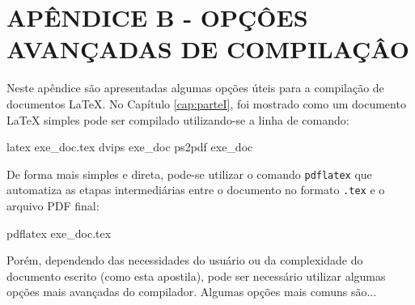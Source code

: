 \hypertarget{estilo:apendice1}{} %
\renewcommand{\thechapter}{}%
\chapter{APÊNDICE B - OPÇÔES AVANÇADAS DE COMPILAÇÂO}  %
\label{apendiceB} %
\renewcommand{\thechapter}{B}%

Neste apêndice são apresentadas algumas opções úteis para a compilação de documentos \LaTeX{}. No Capítulo \ref{cap:parteI}, foi mostrado como um documento \LaTeX{} simples pode ser compilado utilizando-se a linha de comando:

\begin{meucomando}
latex exe_doc.tex 
dvips exe_doc
ps2pdf exe_doc
\end{meucomando}

De forma mais simples e direta, pode-se utilizar o comando {\tt pdflatex} que automatiza as etapas intermediárias entre o documento no formato {\tt .tex} e o arquivo PDF final:

\begin{meucomando}
pdflatex exe_doc.tex
\end{meucomando}

Porém, dependendo das necessidades do usuário ou da complexidade do documento escrito (como esta apostila), pode ser necessário utilizar algumas opções mais avançadas do compilador. Algumas opções mais comuns são...



